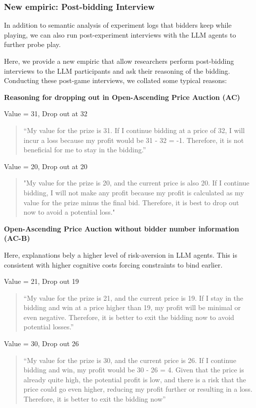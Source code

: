 \documentclass{article} %
\begin{document}
\subsubsection{New empiric: Post-bidding Interview}

In addition to semantic analysis of experiment logs that bidders keep while playing, we can also run post-experiment interviews with the LLM agents to further probe play.

Here, we provide a new empiric that allow researchers perform post-bidding interviews to the LLM participants and ask their reasoning of the bidding. 
Conducting these post-game interviews, we collated some typical reasons:

\textbf{Reasoning for dropping out in Open-Ascending Price Auction (AC)}


Value = 31, Drop out at 32
\begin{quote}
    “My value for the prize is 31. If I continue bidding at a price of 32, I will incur a loss because my profit would be 31 - 32 = -1. Therefore, it is not beneficial for me to stay in the bidding.”
\end{quote}

Value = 20, Drop out at 20
\begin{quote}
    "My value for the prize is 20, and the current price is also 20. If I continue bidding, I will not make any profit because my profit is calculated as my value for the prize minus the final bid. Therefore, it is best to drop out now to avoid a potential loss."
\end{quote}

\textbf{Open-Ascending Price Auction without bidder number information (AC-B)}

Here, explanations bely a higher level of risk-aversion in LLM agents. 
This is consistent with higher cognitive costs forcing constraints to bind earlier.

Value = 21,  Drop out 19
\begin{quote}
    “My value for the prize is 21, and the current price is 19. If I stay in the bidding and win at a price higher than 19, my profit will be minimal or even negative. Therefore, it is better to exit the bidding now to avoid potential losses.”
\end{quote}

Value = 30,  Drop out 26
\begin{quote}
“My value for the prize is 30, and the current price is 26. If I continue bidding and win, my profit would be 30 - 26 = 4. Given that the price is already quite high, the potential profit is low, and there is a risk that the price could go even higher, reducing my profit further or resulting in a loss. Therefore, it is better to exit the bidding now”
\end{quote}
\end{document}
